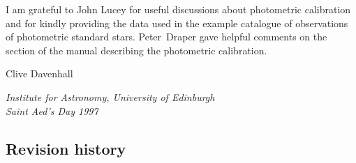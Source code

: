 \documentclass[twoside,11pt]{article}
\renewcommand{\_}{\texttt{\symbol{95}}}
\begin{document}
I am grateful to John Lucey for useful discussions about photometric
calibration and for kindly providing the data used in the example
catalogue of observations of photometric standard stars.  Peter~Draper
gave helpful comments on the section of the manual describing the
photometric calibration.

\begin{flushright}
Clive Davenhall \\
\raggedright {\it Institute for Astronomy, University of Edinburgh \\
Saint Aed's Day 1997}
\end{flushright}

\newpage
\subsection*{Revision history}
\end{document}
